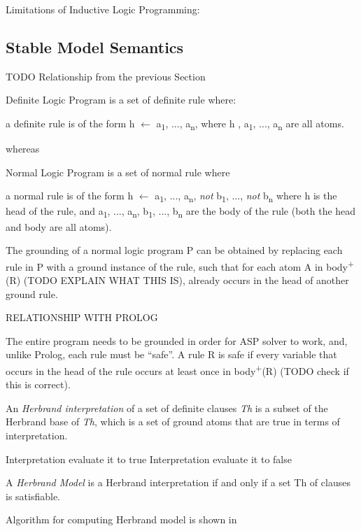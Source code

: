 \documentclass[12pt,twoside]{report}
\begin{document}
Limitations of Inductive Logic Programming:

\subsection{Stable Model Semantics}

TODO Relationship from the previous Section

Definite Logic Program is a set of definite rule where: \newline

a definite rule is of the form h $\leftarrow$ a\textsubscript{1}, ..., a\textsubscript{n}, where h , a\textsubscript{1}, ..., a\textsubscript{n} are all atoms.

whereas

Normal Logic Program is a set of normal rule where

a normal rule is of the form h $\leftarrow$ a\textsubscript{1}, ..., a\textsubscript{n}, \textit{not} b\textsubscript{1}, ..., \textit{not}  b\textsubscript{n} where h is the head of the rule,
 and a\textsubscript{1}, ..., a\textsubscript{n}, b\textsubscript{1}, ..., b\textsubscript{n} are the body of the rule (both the head and body are all atoms).


The grounding of a normal logic program P can be obtained by replacing each rule in P with a ground instance of the rule, such that for each atom A in body\textsuperscript{+} (R) (TODO EXPLAIN WHAT THIS IS), already occurs in the head of another ground rule.


RELATIONSHIP WITH PROLOG

The entire program needs to be grounded in order for ASP solver to work, and, unlike Prolog,  each rule must be \enquote{safe}. A rule R is safe if every variable that occurs in the head of the rule occurs at least once in body\textsuperscript{+}(R) (TODO check if this is correct).

An \textit{Herbrand interpretation} of a set of definite clauses \textit{Th} is a subset of the Herbrand base of \textit{Th}, which is a set of ground atoms that are true in terms of interpretation.



Interpretation evaluate it to true
Interpretation evaluate it to false

A \textit{Herbrand Model} is a Herbrand interpretation if and only if a set Th of clauses is satisfiable.


Algorithm for computing Herbrand model is shown in
\end{document}
